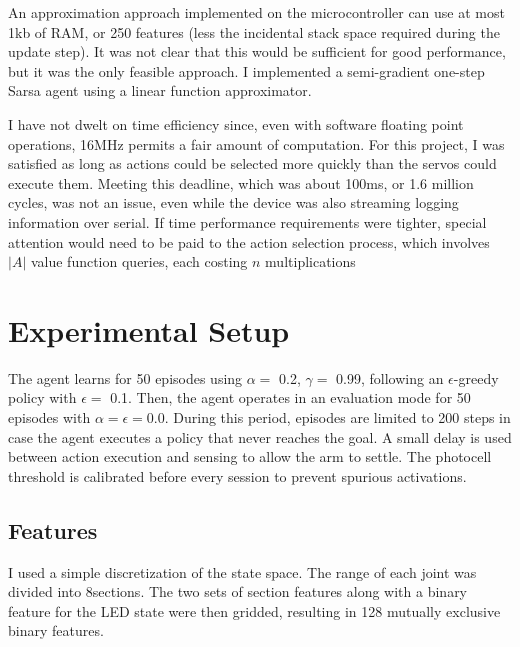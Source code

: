 \documentclass{article}
\begin{document}
An approximation approach implemented on the microcontroller can use at most 1kb of RAM, or 250 features (less the incidental stack space required during the update step). It was not clear that this would be sufficient for good performance, but it was the only feasible approach. I implemented a semi-gradient one-step Sarsa agent using a linear function approximator.
	
I have not dwelt on time efficiency since, even with software floating point operations, 16MHz permits a fair amount of computation. For this project, I was satisfied as long as actions could be selected more quickly than the servos could execute them. Meeting this deadline, which was about 100ms, or 1.6 million cycles, was not an issue, even while the device was also streaming logging information over serial. If time performance requirements were tighter, special attention would need to be paid to the action selection process, which involves $|A|$ value function queries, each costing $n$ multiplications
	
	


\section{Experimental Setup}


The agent learns for 50 episodes using $\alpha =$ 0.2, $\gamma =$ 0.99,  following an $\epsilon$-greedy policy with $\epsilon=$ 0.1. Then, the agent operates in an evaluation mode for 50 episodes with $\alpha=\epsilon=0.0$. During this period, episodes are limited to 200 steps in case the agent executes a policy that never reaches the goal. A small delay is used between action execution and sensing to allow the arm to settle. The photocell threshold is calibrated before every session to prevent spurious activations.

\subsection{Features}

I used a simple discretization of the state space. The range of each joint was divided into 8\space{}\degree\space sections. The two sets of section features along with a binary feature for the LED state were then gridded, resulting in 128 mutually exclusive binary features. 
\end{document}
